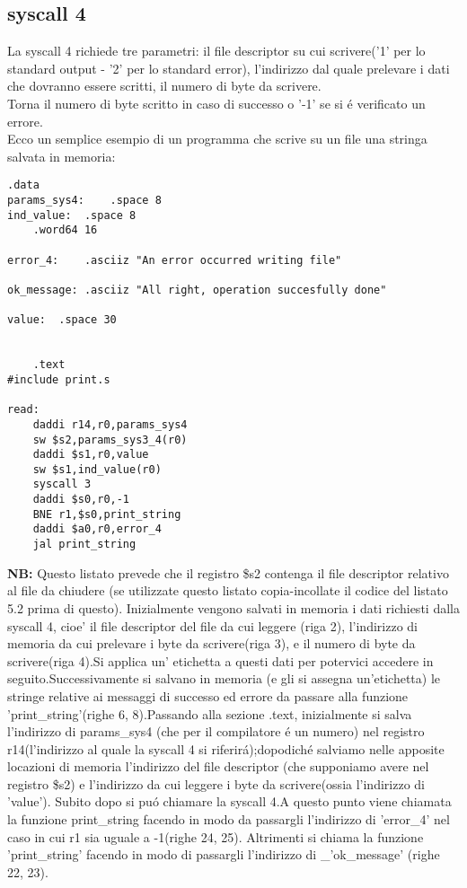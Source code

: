 \documentclass[12pt]{report}
\newcommand{\OF}{\textbf{NB:} Questo listato prevede che il registro \$s2 contenga il file descriptor
relativo al file da chiudere (se utilizzate questo listato copia-incollate il codice del listato 5.2 prima di questo).}
\begin{document}
\subsection{syscall 4}
La syscall 4 richiede tre parametri: il file descriptor su cui scrivere('1' per lo standard output - '2' per lo standard error), 
l’indirizzo dal quale prelevare i dati che dovranno essere scritti, il numero di byte da scrivere.\\
Torna il numero di byte scritto in caso di successo o '-1' se si \'{e} verificato un errore.\\ 
Ecco un semplice esempio di un programma che scrive su un file una stringa salvata in memoria:
\begin{lstlisting}[caption={syscall4}, label={code:syscall4}, style={mips}]
      		.data
params_sys4:	.space 8			
ind_value:	.space 8			
	.word64 16		

error_4:	.asciiz "An error occurred writing file"	

ok_message:	.asciiz "All right, operation succesfully done"	

value:	.space 30								


	.text
#include print.s	

read:
	daddi r14,r0,params_sys4
	sw $s2,params_sys3_4(r0)
	daddi $s1,r0,value	
	sw $s1,ind_value(r0)	
	syscall 3			
	daddi $s0,r0,-1			
	BNE r1,$s0,print_string
	daddi $a0,r0,error_4
	jal print_string				
\end{lstlisting}
\OF{}
Inizialmente vengono salvati in memoria i dati richiesti dalla syscall 4, cioe' il file descriptor del file da cui leggere (riga 2), 
l'indirizzo di memoria da cui prelevare i byte da scrivere(riga 3), e il numero di byte da scrivere(riga 4).Si applica un' etichetta
 a questi dati per potervici accedere in seguito.Successivamente si salvano in memoria (e gli si assegna un'etichetta) le stringe relative ai messaggi 
di successo ed errore da passare alla funzione 'print_string'(righe 6, 8).Passando alla sezione .text, inizialmente si salva l'indirizzo di params_sys4
(che per il compilatore \'{e} un numero) nel registro r14(l'indirizzo al quale la syscall 4 si riferir\'{a});dopodich\'{e} salviamo nelle apposite locazioni 
di memoria l'indirizzo del file descriptor (che supponiamo avere nel registro \$s2) e l'indirizzo da cui leggere i byte da scrivere(ossia l'indirizzo di 'value').
Subito dopo si pu\'{o} chiamare la syscall 4.A questo  punto viene chiamata la funzione print_string facendo in modo da passargli l'indirizzo di 'error_4'
 nel caso in cui r1 sia uguale a -1(righe 24, 25). Altrimenti si chiama la funzione 'print_string' facendo in modo di passargli l'indirizzo di _'ok_message' (righe 22, 23).
\end{document}
